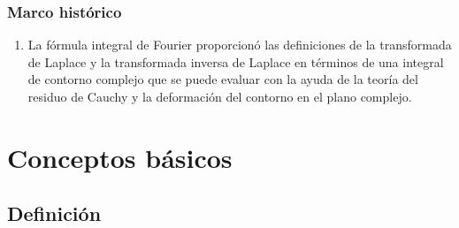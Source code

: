 \documentclass[12pt]{beamer}
\begin{document}
\begin{frame}
\frametitle{Marco histórico}
\begin{enumerate}[<+->]
\conti
\item La fórmula integral de Fourier proporcionó las definiciones de la transformada de Laplace y la transformada inversa de Laplace en términos de una integral de contorno complejo que se puede evaluar con la ayuda de la teoría del residuo de Cauchy y la deformación del contorno en el plano complejo.
\end{enumerate}
\end{frame}

\section{Conceptos básicos}
\subsection{Definición}
\end{document}
